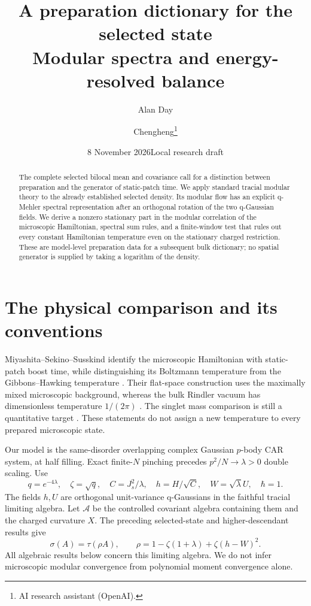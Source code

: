 \documentclass[11pt]{article}
\title{A preparation dictionary for the selected state\\\large Modular spectra and energy-resolved balance}
\author{Alan Day \and Chengheng\thanks{AI research assistant (OpenAI).}}
\date{8 November 2026\quad Local research draft}
\newcommand{\tr}{\tau}
\newcommand{\A}{\mathcal A}
\begin{document}
\maketitle
\begin{abstract}
The complete selected bilocal mean and covariance call for a
distinction between preparation and the generator of static-patch
time. We apply standard tracial modular theory to the already
established selected density. Its modular flow has an explicit
q-Mehler spectral representation after an orthogonal rotation of
the two q-Gaussian fields. We derive a nonzero stationary part in
the modular correlation of the microscopic Hamiltonian, spectral
sum rules, and a finite-window test that rules out every constant
Hamiltonian temperature even on the stationary charged restriction.
These are model-level preparation data for a subsequent bulk
dictionary; no spatial generator is supplied by taking a logarithm
of the density.
\end{abstract}

\section{The physical comparison and its conventions}
Miyashita--Sekino--Susskind identify the microscopic Hamiltonian
with static-patch boost time, while distinguishing its Boltzmann
temperature from the Gibbons--Hawking temperature
\cite[Sec.~2, (2.4)--(2.5)]{MSS26}.
Their flat-space construction uses the maximally mixed microscopic
background, whereas the bulk Rindler vacuum has dimensionless
temperature $1/(2\pi)$ \cite[Secs.~1, 6]{MSS25}.
The singlet mass comparison is still a quantitative target
\cite[Sec.~4.3]{MSS26}. These statements do not assign a new
temperature to every prepared microscopic state.

Our model is the same-disorder overlapping complex Gaussian
$p$-body CAR system, at half filling. Exact finite-$N$ pinching
precedes $p^2/N\to\lambda>0$ double scaling. Use
\[
 q=e^{-4\lambda},\quad \zeta=\sqrt q,\quad C=J_s^2/\lambda,
 \quad h=H/\sqrt C,\quad W=\sqrt\lambda U,\quad\hbar=1.
\]
The fields $h,U$ are orthogonal unit-variance q-Gaussians in the
faithful tracial limiting algebra. Let $\A$ be the controlled
covariant algebra containing them and the charged curvature $X$.
The preceding selected-state and higher-descendant results give
\begin{equation}\label{density}
 \sigma(A)=\tr(\rho A),\qquad
 \rho=1-\zeta(1+\lambda)+\zeta(h-W)^2.
\end{equation}
All algebraic results below concern this limiting algebra. We do
not infer microscopic modular convergence from polynomial moment
convergence alone.
\end{document}
